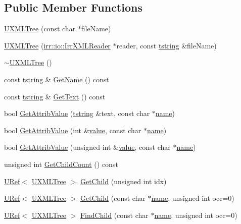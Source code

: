\subsection*{Public Member Functions}
\begin{CompactItemize}
\item 
\hyperlink{class_u_x_m_l_tree_43aebc5e4b1221b4989697ea779b802f}{UXMLTree} (const char $\ast$fileName)
\item 
\hyperlink{class_u_x_m_l_tree_c8aae9d2fa6a1c6fc60a5ae2a7d8211f}{UXMLTree} (\hyperlink{classirr_1_1io_1_1_i_irr_x_m_l_reader}{irr::io::IrrXMLReader} $\ast$reader, const \hyperlink{common__afx_8h_816fa58fd77499b0edb2c69ebe803d5c}{tstring} \&fileName)
\item 
\hyperlink{class_u_x_m_l_tree_db9c9722b57e6c62f805f6c922000c01}{$\sim$UXMLTree} ()
\item 
const \hyperlink{common__afx_8h_816fa58fd77499b0edb2c69ebe803d5c}{tstring} \& \hyperlink{class_u_x_m_l_tree_06625e14b1b2ec2e8c35cfaa9bf5fa15}{GetName} () const 
\item 
const \hyperlink{common__afx_8h_816fa58fd77499b0edb2c69ebe803d5c}{tstring} \& \hyperlink{class_u_x_m_l_tree_4c6ca28ab1ca79c50cf12d457d72a40b}{GetText} () const 
\item 
bool \hyperlink{class_u_x_m_l_tree_008c44aa797b9414460e473c2fdff76e}{GetAttribValue} (\hyperlink{common__afx_8h_816fa58fd77499b0edb2c69ebe803d5c}{tstring} \&text, const char $\ast$\hyperlink{glext__bak_8h_bb62efe59ccdd153ce42e1a418352209}{name})
\item 
bool \hyperlink{class_u_x_m_l_tree_7c795f2aca9fee7edac2b2160f8a65ff}{GetAttribValue} (int \&\hyperlink{glext__bak_8h_6a4f8a1a444e9080b297963b3db29fe0}{value}, const char $\ast$\hyperlink{glext__bak_8h_bb62efe59ccdd153ce42e1a418352209}{name})
\item 
bool \hyperlink{class_u_x_m_l_tree_3cf9e4c1b856b3143959df4624cb3be8}{GetAttribValue} (unsigned int \&\hyperlink{glext__bak_8h_6a4f8a1a444e9080b297963b3db29fe0}{value}, const char $\ast$\hyperlink{glext__bak_8h_bb62efe59ccdd153ce42e1a418352209}{name})
\item 
unsigned int \hyperlink{class_u_x_m_l_tree_a22f7f11cbd183d21f622b8c9ffec86f}{GetChildCount} () const 
\item 
\hyperlink{class_u_ref}{URef}$<$ \hyperlink{class_u_x_m_l_tree}{UXMLTree} $>$ \hyperlink{class_u_x_m_l_tree_3fb955c316489c5d83d319bcb80e872e}{GetChild} (unsigned int idx)
\item 
\hyperlink{class_u_ref}{URef}$<$ \hyperlink{class_u_x_m_l_tree}{UXMLTree} $>$ \hyperlink{class_u_x_m_l_tree_b8fcb5c72e4ed0707522d966a50974c3}{GetChild} (const char $\ast$\hyperlink{glext__bak_8h_bb62efe59ccdd153ce42e1a418352209}{name}, unsigned int occ=0)
\item 
\hyperlink{class_u_ref}{URef}$<$ \hyperlink{class_u_x_m_l_tree}{UXMLTree} $>$ \hyperlink{class_u_x_m_l_tree_55133de5b659c685d4db66c730b55b98}{FindChild} (const char $\ast$\hyperlink{glext__bak_8h_bb62efe59ccdd153ce42e1a418352209}{name}, unsigned int occ=0)
\end{CompactItemize}


